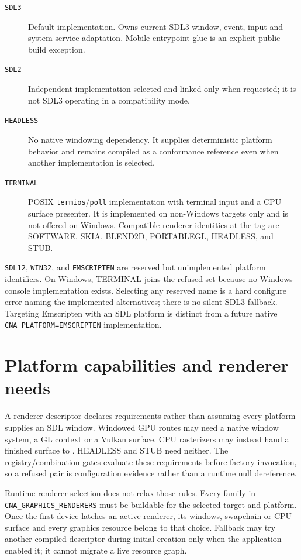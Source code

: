 \begin{description}
  \item[\texttt{SDL3}] Default implementation. Owns current SDL3 window, event, input and system
    service adaptation. Mobile entrypoint glue is an explicit public-build exception.
  \item[\texttt{SDL2}] Independent implementation selected and linked only when requested; it is
    not SDL3 operating in a compatibility mode.
  \item[\texttt{HEADLESS}] No native windowing dependency. It supplies deterministic platform
    behavior and remains compiled as a conformance reference even when another implementation is
    selected.
  \item[\texttt{TERMINAL}] POSIX \texttt{termios}/\texttt{poll} implementation with terminal
    input and a CPU surface presenter. It is implemented on non-Windows targets only and is not
    offered on Windows. Compatible renderer identities at the tag are SOFTWARE, SKIA, BLEND2D,
    PORTABLEGL, HEADLESS, and STUB.
\end{description}

\texttt{SDL12}, \texttt{WIN32}, and \texttt{EMSCRIPTEN} are reserved but unimplemented platform
identifiers. On Windows, TERMINAL joins the refused set because no Windows console implementation
exists. Selecting any reserved name is a hard configure error naming the implemented alternatives;
there is no silent SDL3 fallback. Targeting Emscripten with an SDL platform is distinct from a
future native \texttt{CNA\_PLATFORM=EMSCRIPTEN} implementation.

\section{Platform capabilities and renderer needs}

A renderer descriptor declares requirements rather than assuming every platform supplies an SDL
window. Windowed GPU routes may need a native window system, a GL context or a Vulkan surface.
CPU rasterizers may instead hand a finished surface to
. HEADLESS and STUB need neither. The registry/combination
gates evaluate these requirements before factory invocation, so a refused pair is configuration
evidence rather than a runtime null dereference.

Runtime renderer selection does not relax those rules. Every family in
\texttt{CNA\_GRAPHICS\_RENDERERS} must be buildable for the selected target and platform. Once the
first device latches an active renderer, its windows, swapchain or CPU surface and every graphics
resource belong to that choice. Fallback may try another compiled descriptor during initial
creation only when the application enabled it; it cannot migrate a live resource graph.

